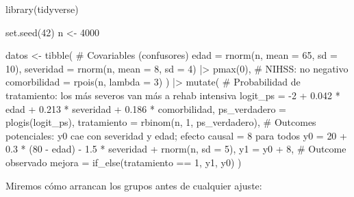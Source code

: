 \documentclass[
  letterpaper,
  DIV=11,
  numbers=noendperiod,
  oneside]{scrreprt}
\newenvironment{Shaded}{\begin{snugshade}}{\end{snugshade}}
\newcommand{\AttributeTok}[1]{\textcolor[rgb]{0.40,0.45,0.13}{#1}}
\newcommand{\CommentTok}[1]{\textcolor[rgb]{0.37,0.37,0.37}{#1}}
\newcommand{\DecValTok}[1]{\textcolor[rgb]{0.68,0.00,0.00}{#1}}
\newcommand{\FloatTok}[1]{\textcolor[rgb]{0.68,0.00,0.00}{#1}}
\newcommand{\FunctionTok}[1]{\textcolor[rgb]{0.28,0.35,0.67}{#1}}
\newcommand{\NormalTok}[1]{\textcolor[rgb]{0.00,0.23,0.31}{#1}}
\newcommand{\OtherTok}[1]{\textcolor[rgb]{0.00,0.23,0.31}{#1}}
\newcommand{\SpecialCharTok}[1]{\textcolor[rgb]{0.37,0.37,0.37}{#1}}
\begin{document}
\begin{Shaded}
\begin{Highlighting}[]
\FunctionTok{library}\NormalTok{(tidyverse)}

\FunctionTok{set.seed}\NormalTok{(}\DecValTok{42}\NormalTok{)}
\NormalTok{n }\OtherTok{\textless{}{-}} \DecValTok{4000}

\NormalTok{datos }\OtherTok{\textless{}{-}} \FunctionTok{tibble}\NormalTok{(}
  \CommentTok{\# Covariables (confusores)}
  \AttributeTok{edad        =} \FunctionTok{rnorm}\NormalTok{(n, }\AttributeTok{mean =} \DecValTok{65}\NormalTok{, }\AttributeTok{sd =} \DecValTok{10}\NormalTok{),}
  \AttributeTok{severidad   =} \FunctionTok{rnorm}\NormalTok{(n, }\AttributeTok{mean =} \DecValTok{8}\NormalTok{,  }\AttributeTok{sd =} \DecValTok{4}\NormalTok{) }\SpecialCharTok{|\textgreater{}} \FunctionTok{pmax}\NormalTok{(}\DecValTok{0}\NormalTok{),   }\CommentTok{\# NIHSS: no negativo}
  \AttributeTok{comorbilidad =} \FunctionTok{rpois}\NormalTok{(n, }\AttributeTok{lambda =} \DecValTok{3}\NormalTok{)}
\NormalTok{) }\SpecialCharTok{|\textgreater{}}
  \FunctionTok{mutate}\NormalTok{(}
    \CommentTok{\# Probabilidad de tratamiento: los más severos van más a rehab intensiva}
    \AttributeTok{logit\_ps    =} \SpecialCharTok{{-}}\DecValTok{2} \SpecialCharTok{+} \FloatTok{0.042} \SpecialCharTok{*}\NormalTok{ edad }\SpecialCharTok{+} \FloatTok{0.213} \SpecialCharTok{*}\NormalTok{ severidad }\SpecialCharTok{+} \FloatTok{0.186} \SpecialCharTok{*}\NormalTok{ comorbilidad,}
    \AttributeTok{ps\_verdadero =} \FunctionTok{plogis}\NormalTok{(logit\_ps),}
    \AttributeTok{tratamiento =} \FunctionTok{rbinom}\NormalTok{(n, }\DecValTok{1}\NormalTok{, ps\_verdadero),}
    \CommentTok{\# Outcomes potenciales: y0 cae con severidad y edad; efecto causal = 8 para todos}
    \AttributeTok{y0 =} \DecValTok{20} \SpecialCharTok{+} \FloatTok{0.3} \SpecialCharTok{*}\NormalTok{ (}\DecValTok{80} \SpecialCharTok{{-}}\NormalTok{ edad) }\SpecialCharTok{{-}} \FloatTok{1.5} \SpecialCharTok{*}\NormalTok{ severidad }\SpecialCharTok{+} \FunctionTok{rnorm}\NormalTok{(n, }\AttributeTok{sd =} \DecValTok{5}\NormalTok{),}
    \AttributeTok{y1 =}\NormalTok{ y0 }\SpecialCharTok{+} \DecValTok{8}\NormalTok{,}
    \CommentTok{\# Outcome observado}
    \AttributeTok{mejora =} \FunctionTok{if\_else}\NormalTok{(tratamiento }\SpecialCharTok{==} \DecValTok{1}\NormalTok{, y1, y0)}
\NormalTok{  )}
\end{Highlighting}
\end{Shaded}

Miremos cómo arrancan los grupos antes de cualquier ajuste:
\end{document}
